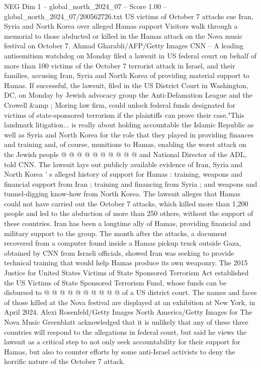 \begin{textsample}{NEG Dim 1 – global\_north\_2024\_07 – Score 1.00 – global\_north\_2024\_07/200562726.txt}  \label{ex:f1_neg_272}
US victims of October 7 attacks sue Iran, Syria and North Korea over alleged Hamas support Visitors walk through a memorial to those abducted or killed in the Hamas attack on the Nova music festival on October 7.
Ahmad Gharabli/AFP/Getty Images CNN -- A leading antisemitism watchdog on Monday filed a lawsuit in US federal court on behalf of more than 100 victims of the October 7 terrorist attack in Israel, and their families, accusing Iran, Syria and North Korea of providing material support to Hamas.
If successful, the lawsuit, filed in the US District Court in Washington, DC, on Monday by Jewish advocacy group the Anti-Defamation League and the Crowell \&amp ; Moring law firm, could unlock federal funds designated for victims of state-sponsored terrorism if the plaintiffs can prove their case."This landmark litigation... is really about holding accountable the Islamic Republic as well as Syria and North Korea for the role that they played in providing finances and training and, of course, munitions to Hamas, enabling the worst attack on the Jewish people @ @ @ @ @ @ @ @ @ @ and National Director of the ADL, told CNN.
The lawsuit lays out publicly available evidence of Iran, Syria and North Korea ' s alleged history of support for Hamas : training, weapons and financial support from Iran ; training and financing from Syria ; and weapons and tunnel-digging know-how from North Korea.
The lawsuit alleges that Hamas could not have carried out the October 7 attacks, which killed more than 1,200 people and led to the abduction of more than 250 others, without the support of these countries.
Iran has been a longtime ally of Hamas, providing financial and military support to the group.
The month after the attacks, a document recovered from a computer found inside a Hamas pickup truck outside Gaza, obtained by CNN from Israeli officials, showed Iran was seeking to provide technical training that would help Hamas produce its own weaponry.
The 2015 Justice for United States Victims of State Sponsored Terrorism Act established the US Victims of State Sponsored Terrorism Fund, whose funds can be disbursed to @ @ @ @ @ @ @ @ @ @ of a US district court.
The names and faces of those killed at the Nova festival are displayed at an exhibition at New York, in April 2024.
Alexi Rosenfeld/Getty Images North America/Getty Images for The Nova Music Greenblatt acknowledged that it is unlikely that any of these three countries will respond to the allegations in federal court, but said he views the lawsuit as a critical step to not only seek accountability for their support for Hamas, but also to counter efforts by some anti-Israel activists to deny the horrific nature of the October 7 attack.

\end{textsample}
